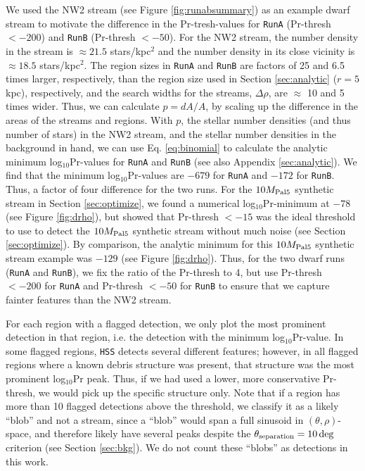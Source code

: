 \documentclass[twocolumn]{aastex631}
\begin{document}
We used the NW2 stream (see Figure \ref{fig:runabsummary}) as an example dwarf stream to motivate the difference in the  Pr-tresh-values for \texttt{RunA} (Pr-thresh $< -200$) and \texttt{RunB} (Pr-thresh $< -50$). For the NW2 stream, the number density in the stream is ${\approx}21.5$  stars/kpc$^2$ and the number density in its close vicinity is ${\approx}18.5$ stars/kpc$^2$. The region sizes in \texttt{RunA} and \texttt{RunB} are factors of 25 and 6.5 times larger, respectively, than the region size used in Section \ref{sec:analytic} ($r = 5$ kpc), respectively, and the search widths for the streams, $\Delta\rho$, are $\approx$ 10 and 5 times wider. Thus, we can calculate $p=dA/A$, by scaling up the difference in the areas of the streams and regions. With $p$, the stellar number densities (and thus number of stars) in the NW2 stream, and the stellar number densities in the background in hand, we can use Eq. \ref{eq:binomial} to calculate the analytic minimum log$_{10}$Pr-values for \texttt{RunA} and \texttt{RunB} (see also Appendix \ref{sec:analytic}). We find that the minimum log$_{10}$Pr-values are $-679$ for \texttt{RunA} and $-172$ for \texttt{RunB}. Thus, a factor of four difference for the two runs. For the $10{M}_{\rm Pal 5}$ synthetic stream in Section \ref{sec:optimize}, we found a numerical log$_{10}$Pr-minimum at $-78$ (see Figure \ref{fig:drho}), but showed that Pr-thresh $< -15$ was the ideal threshold to use to detect the $10{M}_{\rm Pal 5}$ synthetic stream without much noise (see Section \ref{sec:optimize}). By comparison, the analytic minimum for this $10{M}_{\rm Pal 5}$ synthetic stream example was $-129$ (see Figure \ref{fig:drho}). Thus, for the two dwarf runs (\texttt{RunA} and \texttt{RunB}), we fix the ratio of the Pr-thresh to 4, but use Pr-thresh $< -200$ for \texttt{RunA} and  Pr-thresh $< -50$ for \texttt{RunB} to ensure that we capture fainter features than the NW2 stream. 


For each region with a flagged detection, we only plot the most prominent detection in that region, i.e. the detection with the minimum log$_{10}$Pr-value. In some flagged regions, \texttt{HSS} detects several different features; however, in all flagged regions where a known debris structure was present, that structure was the most  prominent log$_{10}$Pr peak. Thus, if we had used a lower, more conservative Pr-thresh, we would pick up the specific structure only. Note that if a region has more than 10 flagged detections above the threshold, we classify it as a likely ``blob'' and not a stream, since a ``blob'' would span a full sinusoid in $(\theta,\rho)$-space, and therefore likely have several peaks despite the $\theta_{\rm separation} = 10\deg$ criterion (see Section \ref{sec:bkg}). We do not count these ``blobs'' as detections in this work. 
\end{document}
